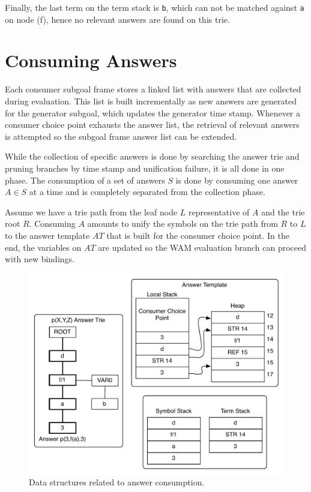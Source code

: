 Finally, the last term on the term stack is \texttt{b}, which
can not be matched against \texttt{a} on node (f), hence no
relevant answers are found on this trie.

\section{Consuming Answers}

Each consumer subgoal frame stores a linked list with answers that are collected
during evaluation. This list is built incrementally as new answers are generated
for the generator subgoal, which updates the generator time stamp.
Whenever a consumer choice point exhausts the answer list, the retrieval
of relevant answers is attempted so the subgoal frame answer list can be extended.

While the collection of specific answers is done by searching the answer trie
and pruning branches by time stamp and unification failure, it is all done in one
phase. The consumption of a set of answers $S$ is done by consuming one answer $A \in S$
at a time and is completely separated from the collection phase.

Assume we have a trie path from the leaf node $L$ representative of $A$ and
the trie root $R$. Consuming $A$ amounts to unify the symbols on the trie path from $R$ to $L$
to the answer template $AT$ that is built for the consumer choice point. In the end, the variables
on $AT$ are updated so the WAM evaluation branch can proceed with new bindings.

\begin{figure}[H]
  \centering
    \includegraphics[scale=0.6]{consume_answer.pdf}
  \caption{Data structures related to answer consumption.}
  \label{fig:consume_answer}
\end{figure}

